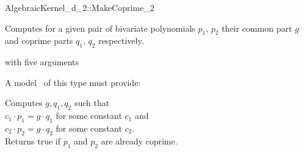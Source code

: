 \begin{ccRefFunctionObjectConcept}{AlgebraicKernel_d_2::MakeCoprime_2}

\ccDefinition
Computes for a given pair of bivariate polynomials $p_1$, $p_2$ their
common part $g$ and coprime parts $q_1$, $q_2$ respectively.

\ccRefines 
{} with five arguments 

\ccOperations
{}
A model \ccVar\ of this type must provide:

{ Computes $g, q_1, q_2$ such that\\
$c_1 \cdot p_1 =  g \cdot q_1$ for some constant $c_1$ and\\
$c_2 \cdot p_2 =  g \cdot q_2$ for some constant $c_2$.\\
Returns true if $p_1$ and $p_2$ are already coprime. 
}

\ccSeeAlso
{}\\

\end{ccRefFunctionObjectConcept}

